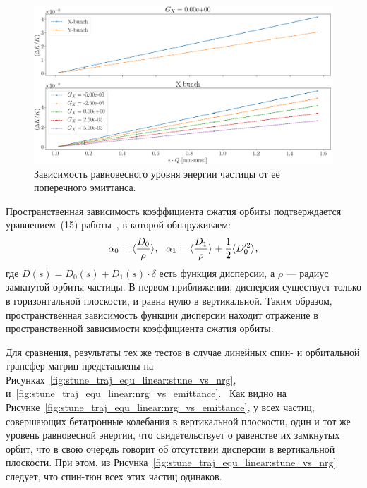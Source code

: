 \begin{figure}[h]
	\centering
	\includegraphics[height=.3\paperheight]{images/stune_traj_equ/equ_energy_vs_emittance}
	\caption{Зависимость равновесного уровня энергии частицы от её поперечного эмиттанса.\label{fig:equ_nrg_vs_emittance}}
\end{figure}

Пространственная зависимость коэффициента сжатия орбиты подтверждается уравнением~(15) работы~\cite{Senichev:IPAC13}, в которой обнаруживаем:
\[
\alpha_0 = \avg{\frac{D_0}{\rho}},~~ \alpha_1 = \avg{\frac{D_1}{\rho}} + \frac12\avg{D_0'^2},
\]
где $D(s) = D_0(s) + D_1(s)\cdot \delta$  есть функция дисперсии, а $\rho$ --- радиус замкнутой орбиты частицы.
В первом приближении, дисперсия существует только в горизонтальной плоскости, и равна нулю в вертикальной. Таким образом, пространственная зависимость функции дисперсии находит отражение в пространственной зависимости коэффициента сжатия орбиты.

Для сравнения, результаты тех же тестов в случае линейных спин- и орбитальной трансфер матриц представлены на Рисунках~\ref{fig:stune_traj_equ_linear:stune_vs_nrg}, и~\ref{fig:stune_traj_equ_linear:nrg_vs_emittance}.  Как видно на Рисунке~\ref{fig:stune_traj_equ_linear:nrg_vs_emittance}, у всех частиц, совершающих бетатронные колебания в вертикальной плоскости, один и тот же уровень равновесной энергии, что свидетельствует о равенстве их замкнутых орбит, что в свою очередь говорит об отсутствии дисперсии в вертикальной плоскости. При этом, из Рисунка~\ref{fig:stune_traj_equ_linear:stune_vs_nrg} следует, что спин-тюн всех этих частиц одинаков.

